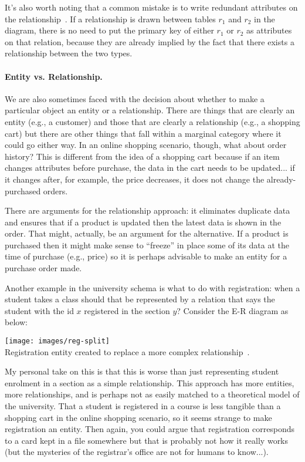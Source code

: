 \documentclass[a4paper]{report}
\begin{document}
It's also worth noting that a common mistake is to write redundant attributes on the relationship~\cite{dsc}. If a relationship is drawn between tables $r_{1}$ and $r_{2}$ in the diagram, there is no need to put the primary key of either $r_{1}$ or $r_{2}$ as attributes on that relation, because they are already implied by the fact that there exists a relationship between the two types. 

\paragraph{Entity vs. Relationship.} We are also sometimes faced with the decision about whether to make a particular object an entity or a relationship. There are things that are clearly an entity (e.g., a customer) and those that are clearly a relationship (e.g., a shopping cart) but there are other things that fall within a marginal category where it could go either way. In an online shopping scenario, though, what about order history? This is different from the idea of a shopping cart because if an item changes attributes before purchase, the data in the cart needs to be updated... if it changes after, for example, the price decreases, it does not change the already-purchased orders.

There are arguments for the relationship approach: it eliminates duplicate data and ensures that if a product is updated then the latest data is shown in the order. That might, actually, be an argument for the alternative. If a product is purchased then it might make sense to ``freeze'' in place some of its data at the time of purchase (e.g., price) so it is perhaps advisable to make an entity for a purchase order made. 

Another example in the university schema is what to do with registration: when a student takes a class should that be represented by a relation that says the student with the id $x$ registered in the section $y$? Consider the E-R diagram as below:

\begin{center}
	\texttt{[image: images/reg-split]}\\
	Registration entity created to replace a more complex relationship~\cite{dsc}.
\end{center}

My personal take on this is that this is worse than just representing student enrolment in a section as a simple relationship. This approach has more entities, more relationships, and is perhaps not as easily matched to a theoretical model of the university. That a student is registered in a course is less tangible than a shopping cart in the online shopping scenario, so it seems strange to make registration an entity. Then again, you could argue that registration corresponds to a card kept in a file somewhere but that is probably not how it really works (but the mysteries of the registrar's office are not for humans to know...).
\end{document}
